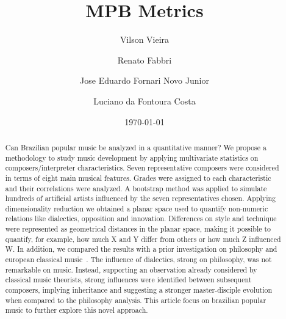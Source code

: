 \documentclass[
 aip,
 jmp,
 amsmath,amssymb,
 reprint,
]{revtex4-1}
\begin{document}

\title[MPB Metrics]{MPB Metrics}

\author{Vilson Vieira}

\author{Renato Fabbri}

\author{Jose Eduardo Fornari Novo Junior}

\author{Luciano da Fontoura Costa}

\date{\today}

\begin{abstract}

Can Brazilian popular music be analyzed in a quantitative manner? We propose a
methodology
to study music development by
applying multivariate statistics on composers/interpreter characteristics.
Seven representative composers were considered in terms of
eight main musical features. 
Grades
were assigned to each characteristic and their correlations were
analyzed. 
A bootstrap method was
applied to simulate hundreds of artificial artists
influenced by the seven representatives chosen.
Applying dimensionality
reduction we obtained a planar space
used to quantify non-numeric relations like dialectics, opposition
and innovation.
Differences on style and technique were represented
as geometrical distances in the planar space, making it possible to
quantify, for example, how much X and Y differ from others or how
much Z influenced W.
In addition, we compared the results with a prior investigation
on
philosophy and european classical music~\cite{Fabbri}. The influence of dialectics, strong on
philosophy, was not remarkable on music.
Instead, supporting an observation already considered by classical music
theorists, strong influences were identified between
subsequent composers, implying inheritance and suggesting a stronger
master-disciple evolution when compared to the philosophy analysis.
This article focus on brazilian popular music to further explore this novel approach.  
\end{abstract}

\end{document}
